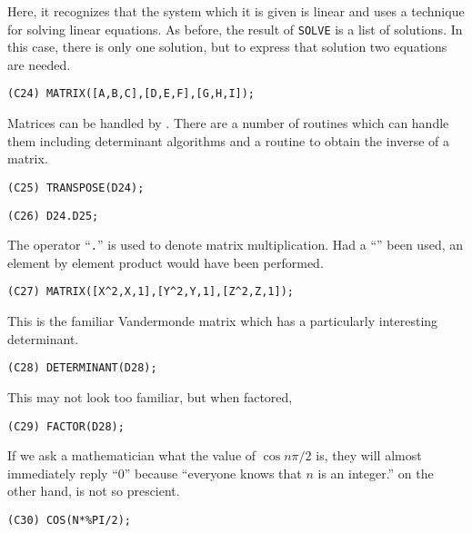 Here, it recognizes that the system which it is given is linear and
uses a technique for solving linear equations.  As before, the result of 
{\tt SOLVE} is a list of solutions.  In this case, there is only one solution,
but to express that solution two equations are needed.
\begin{verbatim}
(C24) MATRIX([A,B,C],[D,E,F],[G,H,I]);
\end{verbatim}
Matrices can be handled by {\Macsyma}.  There are a number of routines which
can handle them including determinant algorithms and a routine to obtain
the inverse of a matrix.
\begin{verbatim}
(C25) TRANSPOSE(D24);
\end{verbatim}

\begin{verbatim}
(C26) D24.D25;
\end{verbatim}
The operator ``{\tt .}'' is used to denote matrix multiplication.  Had
a ``{\tt *}'' been used, an element by element product would have been 
performed. 

\begin{verbatim}
(C27) MATRIX([X^2,X,1],[Y^2,Y,1],[Z^2,Z,1]);
\end{verbatim}
This is the familiar Vandermonde matrix which has a particularly
interesting determinant.
\begin{verbatim}
(C28) DETERMINANT(D28);
\end{verbatim}
This may not look too familiar, but when factored, 
\begin{verbatim}
(C29) FACTOR(D28);
\end{verbatim}
If we ask a mathematician what the value of $\cos n \pi / 2$ is,
they will almost immediately reply ``0'' because ``everyone knows that
$n$ is an integer.''  {\Macsyma} on the other hand, is not so prescient.  
\begin{verbatim}
(C30) COS(N*%PI/2);
\end{verbatim}

